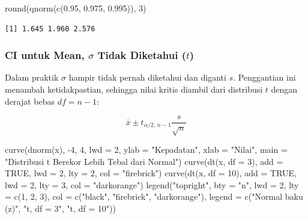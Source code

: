 \documentclass[
  indonesian,
  letterpaper,
]{book}
\newenvironment{Shaded}{\begin{snugshade}}{\end{snugshade}}
\newcommand{\AttributeTok}[1]{\textcolor[rgb]{0.40,0.45,0.13}{#1}}
\newcommand{\ConstantTok}[1]{\textcolor[rgb]{0.56,0.35,0.01}{#1}}
\newcommand{\DecValTok}[1]{\textcolor[rgb]{0.68,0.00,0.00}{#1}}
\newcommand{\FloatTok}[1]{\textcolor[rgb]{0.68,0.00,0.00}{#1}}
\newcommand{\FunctionTok}[1]{\textcolor[rgb]{0.28,0.35,0.67}{#1}}
\newcommand{\NormalTok}[1]{\textcolor[rgb]{0.00,0.23,0.31}{#1}}
\newcommand{\SpecialCharTok}[1]{\textcolor[rgb]{0.37,0.37,0.37}{#1}}
\newcommand{\StringTok}[1]{\textcolor[rgb]{0.13,0.47,0.30}{#1}}
\begin{document}
\begin{Shaded}
\begin{Highlighting}[]
\FunctionTok{round}\NormalTok{(}\FunctionTok{qnorm}\NormalTok{(}\FunctionTok{c}\NormalTok{(}\FloatTok{0.95}\NormalTok{, }\FloatTok{0.975}\NormalTok{, }\FloatTok{0.995}\NormalTok{)), }\DecValTok{3}\NormalTok{)}
\end{Highlighting}
\end{Shaded}

\begin{verbatim}
[1] 1.645 1.960 2.576
\end{verbatim}

\subsubsection{\texorpdfstring{CI untuk Mean, \(\sigma\) Tidak Diketahui
(\(t\))}{CI untuk Mean, \textbackslash sigma Tidak Diketahui (t)}}\label{ci-untuk-mean-sigma-tidak-diketahui-t}

Dalam praktik \(\sigma\) hampir tidak pernah diketahui dan diganti
\(s\). Penggantian ini menambah ketidakpastian, sehingga nilai kritis
diambil dari distribusi \(t\) dengan derajat bebas \(df = n - 1\):

\[\bar{x} \pm t_{\alpha/2,\, n-1} \frac{s}{\sqrt{n}}\]

\begin{Shaded}
\begin{Highlighting}[]
\FunctionTok{curve}\NormalTok{(}\FunctionTok{dnorm}\NormalTok{(x), }\SpecialCharTok{{-}}\DecValTok{4}\NormalTok{, }\DecValTok{4}\NormalTok{, }\AttributeTok{lwd =} \DecValTok{2}\NormalTok{, }\AttributeTok{ylab =} \StringTok{"Kepadatan"}\NormalTok{, }\AttributeTok{xlab =} \StringTok{"Nilai"}\NormalTok{,}
\AttributeTok{main =} \StringTok{"Distribusi t Berekor Lebih Tebal dari Normal"}\NormalTok{)}
\FunctionTok{curve}\NormalTok{(}\FunctionTok{dt}\NormalTok{(x, }\AttributeTok{df =} \DecValTok{3}\NormalTok{), }\AttributeTok{add =} \ConstantTok{TRUE}\NormalTok{, }\AttributeTok{lwd =} \DecValTok{2}\NormalTok{, }\AttributeTok{lty =} \DecValTok{2}\NormalTok{, }\AttributeTok{col =} \StringTok{"firebrick"}\NormalTok{)}
\FunctionTok{curve}\NormalTok{(}\FunctionTok{dt}\NormalTok{(x, }\AttributeTok{df =} \DecValTok{10}\NormalTok{), }\AttributeTok{add =} \ConstantTok{TRUE}\NormalTok{, }\AttributeTok{lwd =} \DecValTok{2}\NormalTok{, }\AttributeTok{lty =} \DecValTok{3}\NormalTok{, }\AttributeTok{col =} \StringTok{"darkorange"}\NormalTok{)}
\FunctionTok{legend}\NormalTok{(}\StringTok{"topright"}\NormalTok{, }\AttributeTok{bty =} \StringTok{"n"}\NormalTok{, }\AttributeTok{lwd =} \DecValTok{2}\NormalTok{, }\AttributeTok{lty =} \FunctionTok{c}\NormalTok{(}\DecValTok{1}\NormalTok{, }\DecValTok{2}\NormalTok{, }\DecValTok{3}\NormalTok{), }\AttributeTok{col =} \FunctionTok{c}\NormalTok{(}\StringTok{"black"}\NormalTok{, }\StringTok{"firebrick"}\NormalTok{, }\StringTok{"darkorange"}\NormalTok{),}
\AttributeTok{legend =} \FunctionTok{c}\NormalTok{(}\StringTok{"Normal baku (z)"}\NormalTok{, }\StringTok{"t, df = 3"}\NormalTok{, }\StringTok{"t, df = 10"}\NormalTok{))}
\end{Highlighting}
\end{Shaded}
\end{document}
